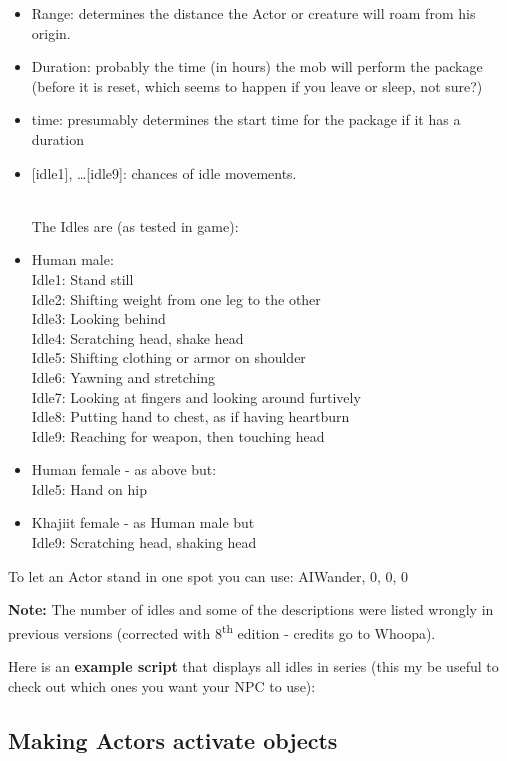 \begin{itemize}
\item
  Range: determines the distance the Actor or creature will roam from
  his origin.
\item
  Duration: probably the time (in hours) the mob will perform the
  package (before it is reset, which seems to happen if you leave or
  sleep, not sure?)
\item
  time: presumably determines the start time for the package if it has a
  duration
\item
  {[}idle1{]}, \ldots{[}idle9{]}: chances of idle movements.\\
  \strut \\
  The Idles are (as tested in game):
\item
  Human male:\\
  Idle1: Stand still\\
  Idle2: Shifting weight from one leg to the other\\
  Idle3: Looking behind\\
  Idle4: Scratching head, shake head\\
  Idle5: Shifting clothing or armor on shoulder\\
  Idle6: Yawning and stretching\\
  Idle7: Looking at fingers and looking around furtively\\
  Idle8: Putting hand to chest, as if having heartburn\\
  Idle9: Reaching for weapon, then touching head
\item
  Human female - as above but:\\
  Idle5: Hand on hip
\item
  Khajiit female - as Human male but\\
  Idle9: Scratching head, shaking head
\end{itemize}

To let an Actor stand in one spot you can use: AIWander, 0, 0, 0

\textbf{Note:} The number of idles and some of the descriptions were
listed wrongly in previous versions (corrected with
8\textsuperscript{th} edition - credits go to Whoopa).

Here is an \textbf{example script} that displays all idles in series
(this my be useful to check out which ones you want your NPC to use):



\hypertarget{making-actors-activate-objects}{%
\subsection{\texorpdfstring{\hfill\break
Making Actors activate
objects}{ Making Actors activate objects}}\label{making-actors-activate-objects}}

